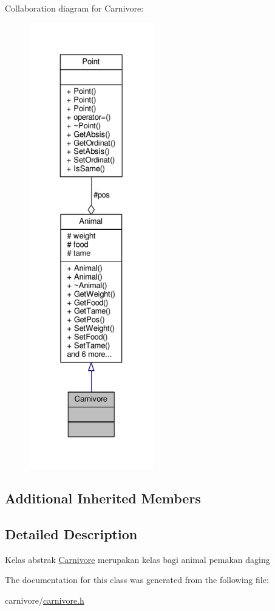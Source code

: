 Collaboration diagram for Carnivore\+:
\nopagebreak
\begin{figure}[H]
\begin{center}
\leavevmode
\includegraphics[height=550pt]{classCarnivore__coll__graph}
\end{center}
\end{figure}
\subsection*{Additional Inherited Members}


\subsection{Detailed Description}
Kelas abstrak \hyperlink{classCarnivore}{Carnivore} merupakan kelas bagi animal pemakan daging 

The documentation for this class was generated from the following file\+:\begin{DoxyCompactItemize}
\item 
carnivore/\hyperlink{carnivore_8h}{carnivore.\+h}\end{DoxyCompactItemize}
